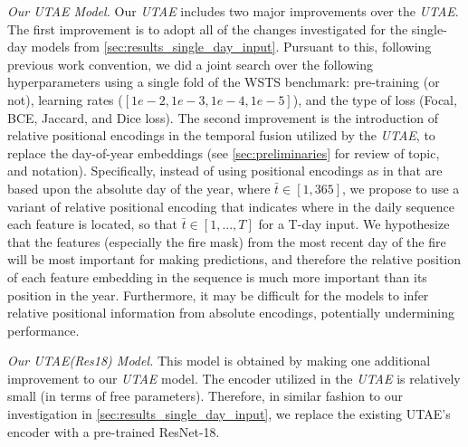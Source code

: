 \textit{Our UTAE Model.} Our \textit{UTAE} includes two major improvements over the \textit{UTAE\cite{gerard2023wildfirespreadts}}. The first improvement is to adopt all of the changes investigated for the single-day models from \cref{sec:results_single_day_input}. Pursuant to this, following previous work convention, we did a joint search over the following hyperparameters using a single fold of the WSTS benchmark: pre-training (or not), learning rates ($[1e-2,1e-3,1e-4,1e-5]$), and the type of loss (Focal, BCE, Jaccard, and Dice loss).  The second improvement is the introduction of relative positional encodings in the temporal fusion utilized by the \textit{UTAE}, to replace the day-of-year embeddings (see \cref{sec:preliminaries} for review of topic, and notation). Specifically, instead of using positional encodings as in \cite{garnot2021panoptic, gerard2023wildfirespreadts} that are based upon the absolute day of the year, where $\bar{t} \in [1,365]$, we propose to use a variant of relative positional encoding that indicates where in the daily sequence each feature is located, so that $\bar{t} \in [1,...,T]$ for a T-day input.  We hypothesize that the features (especially the fire mask) from the most recent day of the fire will be most important for making predictions, and therefore the relative position of each feature embedding in the sequence is much more important than its position in the year. Furthermore, it may be difficult for the models to infer relative positional information from absolute encodings, potentially undermining performance.   

\textit{Our UTAE(Res18) Model.} This model is obtained by making one additional improvement to our \textit{UTAE} model.  The encoder utilized in the \textit{UTAE\cite{gerard2023wildfirespreadts}} is relatively small (in terms of free parameters).  Therefore, in similar fashion to our investigation in \cref{sec:results_single_day_input}, we replace the existing UTAE's encoder with a pre-trained ResNet-18.  

